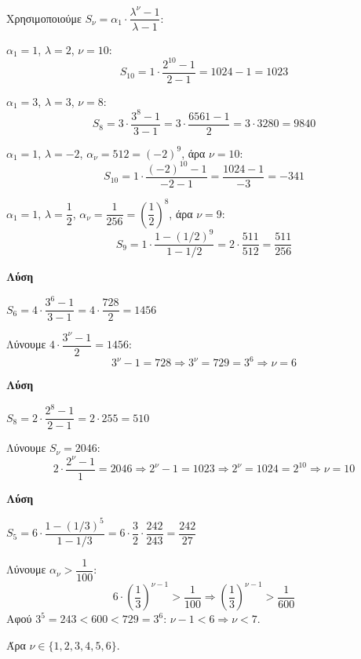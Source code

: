 \documentclass[11pt,a4paper,modern]{FFExercises}
\begin{document}
Χρησιμοποιούμε $S_\nu = \alpha_1 \cdot \dfrac{\lambda^\nu - 1}{\lambda - 1}$:
\begin{alist}
  \item $\alpha_1 = 1$, $\lambda = 2$, $\nu = 10$:
  \[
  S_{10} = 1 \cdot \frac{2^{10} - 1}{2 - 1} = 1024 - 1 = 1023
  \]
  
  \item $\alpha_1 = 3$, $\lambda = 3$, $\nu = 8$:
  \[
  S_8 = 3 \cdot \frac{3^8 - 1}{3 - 1} = 3 \cdot \frac{6561 - 1}{2} = 3 \cdot 3280 = 9840
  \]
  
  \item $\alpha_1 = 1$, $\lambda = -2$, $\alpha_\nu = 512 = (-2)^9$, άρα $\nu = 10$:
  \[
  S_{10} = 1 \cdot \frac{(-2)^{10} - 1}{-2 - 1} = \frac{1024 - 1}{-3} = -341
  \]
  
  \item $\alpha_1 = 1$, $\lambda = \dfrac{1}{2}$, $\alpha_\nu = \dfrac{1}{256} = \left(\dfrac{1}{2}\right)^8$, άρα $\nu = 9$:
  \[
  S_9 = 1 \cdot \frac{1 - (1/2)^9}{1 - 1/2} = 2 \cdot \frac{511}{512} = \frac{511}{256}
  \]
\end{alist}

\askhsh
\textbf{Λύση}
\begin{alist}
  \item $S_6 = 4 \cdot \dfrac{3^6 - 1}{3 - 1} = 4 \cdot \dfrac{728}{2} = 1456$
  
  \item Λύνουμε $4 \cdot \dfrac{3^\nu - 1}{2} = 1456$:
  \[
  3^\nu - 1 = 728 \Rightarrow 3^\nu = 729 = 3^6 \Rightarrow \nu = 6
  \]
\end{alist}

\askhsh
\textbf{Λύση}
\begin{alist}
  \item $S_8 = 2 \cdot \dfrac{2^8 - 1}{2 - 1} = 2 \cdot 255 = 510$
  
  \item Λύνουμε $S_\nu = 2046$:
  \[
  2 \cdot \frac{2^\nu - 1}{1} = 2046 \Rightarrow 2^\nu - 1 = 1023 \Rightarrow 2^\nu = 1024 = 2^{10} \Rightarrow \nu = 10
  \]
\end{alist}

\askhsh
\textbf{Λύση}
\begin{alist}
  \item $S_5 = 6 \cdot \dfrac{1 - (1/3)^5}{1 - 1/3} = 6 \cdot \dfrac{3}{2} \cdot \dfrac{242}{243} = \dfrac{242}{27}$
  
  \item Λύνουμε $\alpha_\nu > \dfrac{1}{100}$:
  \[
  6 \cdot \left(\frac{1}{3}\right)^{\nu-1} > \frac{1}{100} \Rightarrow \left(\frac{1}{3}\right)^{\nu-1} > \frac{1}{600}
  \]
  Αφού $3^5 = 243 < 600 < 729 = 3^6$: $\nu - 1 < 6 \Rightarrow \nu < 7$.
  
  Άρα $\nu \in \{1, 2, 3, 4, 5, 6\}$.
\end{alist}
\end{document}

